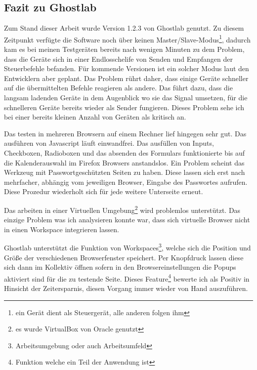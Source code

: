 \documentclass[13pt,a4paper,oneside]{scrbook} %
\renewcommand{\\}{\bigskip}
\begin{document}
		\subsection{Fazit zu Ghostlab}
		Zum Stand dieser Arbeit wurde Version 1.2.3 von Ghostlab genutzt. Zu diesem Zeitpunkt verfügte die Software noch über 		keinen Master/Slave-Modus\footnote{ein Gerät dient als Steuergerät, alle anderen folgen ihm}, dadurch kam es bei meinen 		Testgeräten bereits nach wenigen Minuten zu dem Problem, dass die Geräte sich in einer 								Endlosschelife von Senden und Empfangen der Steuerbefehle befanden. Für kommende Versionen ist ein solcher Modus 		laut den Entwicklern aber geplant. Das Problem rührt daher, dass einige Geräte schneller auf die übermittelten Befehle 			reagieren als andere. Das führt dazu, dass die langsam ladenden Geräte in dem Augenblick wo sie das Signal umsetzen, 		für die schnelleren Geräte bereits wieder als Sender fungieren. Dieses Problem sehe ich bei einer bereits kleinen Anzahl 			von Geräten als kritisch an. 

		\\Das testen in mehreren Browsern auf einem Rechner lief hingegen sehr gut. Das ausführen von Javascript läuft 				einwandfrei. Das ausfüllen von Inputs, Checkboxen, Radioboxen und das absenden des Formulars funktionierte bis auf die 		Kalenderauswahl im Firefox Browsers anstandslos. Ein Problem scheint das Werkzeug mit Passwortgeschützten Seiten zu 		haben. Diese lassen sich erst nach mehrfacher, abhängig vom jeweiligen Browser, Eingabe des Passwortes aufrufen. 			Diese Prozedur wiederholt sich für jede weitere Unterseite erneut. 

		\\Das arbeiten in einer Virtuellen Umgebung\footnote{es wurde VirtualBox von Oracle genutzt} wird problemlos unterstützt. 		Das einzige Problem was ich analysieren konnte war, dass sich virtuelle Browser nicht in einen Workspace integrieren 			lassen.

		\\Ghostlab unterstützt die Funktion von Workspaces\footnote{Arbeitsumgebung oder auch Arbeitsumfeld}, welche sich die 		Position und Größe der verschiedenen Browserfenster speichert. Per Knopfdruck lassen diese sich dann im Kollektiv öffnen 		sofern in den Browsereinstellungen die Popups aktiviert sind für die zu testende Seite. Dieses Feature\footnote{Funktion 			welche ein Teil der Anwendung ist} bewerte ich als Positiv in Hinsicht der Zeitersparnis, diesen Vorgang immer wieder von 		Hand auszuführen.
\end{document}
